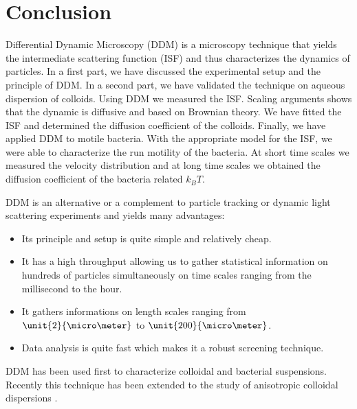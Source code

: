 \documentclass[%
 aip,
 jmp,%
 amsmath,amssymb,
reprint,%
]{revtex4-1}
\begin{document}
\section{\label{sec:leve4}Conclusion}

Differential Dynamic Microscopy (DDM) is a microscopy technique that yields the intermediate scattering function (ISF) and thus characterizes the dynamics of particles. In a first part, we have discussed the experimental setup and the principle of DDM. In a second part, we have validated the technique on aqueous dispersion of colloids. Using DDM we measured the ISF. Scaling arguments shows that the dynamic is diffusive and based on Brownian theory. We have fitted the ISF and determined the diffusion coefficient of the colloids. Finally, we have applied DDM to motile bacteria. With the appropriate model for the ISF, we were able to characterize the run motility of the bacteria. At short time scales we measured the velocity distribution and at long time scales we obtained the diffusion coefficient of the bacteria related $k_BT$.

DDM is an alternative or a complement to particle tracking \citep{7_jaqaman2008robust} or dynamic light scattering experiments and yields many advantages:

\begin{itemize}
\item Its principle and setup is quite simple and relatively cheap.
\item It has a high throughput allowing us to gather statistical information on hundreds of particles simultaneously on time scales ranging from the millisecond to the hour.
\item It gathers informations on length scales ranging from $\unit{2}{\micro\meter}$ to $\unit{200}{\micro\meter}$.
\item Data analysis is quite fast which makes it a robust screening technique.
\end{itemize}

DDM has been used first to characterize colloidal and bacterial suspensions. Recently this technique has been extended to the study of anisotropic colloidal dispersions \citep{20_reufer2012differential}.
\end{document}

